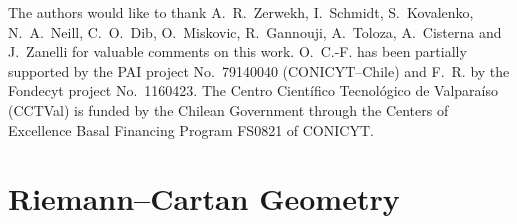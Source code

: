 \documentclass[aps,prd,12pt,superscriptaddress,showpacs,showkeys,reprint,nofootinbib]{revtex4-1}
\begin{document}




\begin{acknowledgments}
  The authors would like to thank A.~R.~Zerwekh, I.~Schmidt,
  S.~Kovalenko, N.~A.~Neill, C.~O.~Dib, O.~Miskovic, R.~Gannouji,
  A.~Toloza, A.~Cisterna and J.~Zanelli for valuable comments on this
  work. \mbox{O.~C.-F.} has been partially supported by the PAI
  project No.~79140040 (CONICYT--Chile) and F.~R. by the Fondecyt
  project No.~1160423. The Centro Cient\'ifico Tecnol\'ogico de
  Valpara\'iso (CCTVal) is funded by the Chilean Government through
  the Centers of Excellence Basal Financing Program FS0821 of CONICYT.
\end{acknowledgments}


\appendix

\section{Riemann--Cartan Geometry\label{Riemann-Cartan}}
\end{document}
